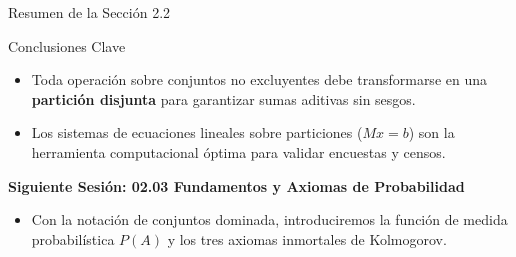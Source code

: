 \documentclass[10pt,aspectratio=169]{beamer}
\begin{document}
\begin{frame}{Resumen de la Sección 2.2}
  \begin{block}{Conclusiones Clave}
    \begin{itemize}
      \item Toda operación sobre conjuntos no excluyentes debe transformarse en una \textbf{partición disjunta} para garantizar sumas aditivas sin sesgos. \pause
      \item Los sistemas de ecuaciones lineales sobre particiones ($Mx = b$) son la herramienta computacional óptima para validar encuestas y censos.
    \end{itemize}
  \end{block}
  
  \vspace{0.6em}
  \pause
  {\large \color{TecAzulOscuro}\textbf{Siguiente Sesión: 02.03 Fundamentos y Axiomas de Probabilidad}}
  \vspace{0.3em}
  \begin{itemize}
    \item Con la notación de conjuntos dominada, introduciremos la función de medida probabilística $P(A)$ y los tres axiomas inmortales de Kolmogorov.
  \end{itemize}
\end{frame}
\end{document}
